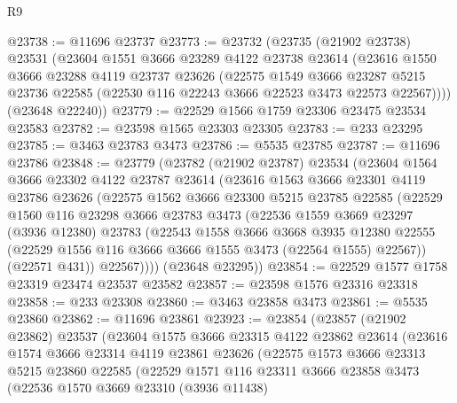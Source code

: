 \begin{lexlean}{R9}
\begin{coremodule}
@23738 := @11696 @23737
@23773 := @23732
    (@23735
      (@21902 @23738)
      @23531
      (@23604
        @1551
        @3666
        @23289
        @4122
        @23738
        @23614
        (@23616
          @1550
          @3666
          @23288
          @4119
          @23737
          @23626
          (@22575
            @1549
            @3666
            @23287
            @5215
            @23736
            @22585
            (@22530 @116 @22243 @3666 @22523 @3473 @22573 @22567))))
      (@23648 @22240))
@23779 := @22529 @1566 @1759 @23306 @23475 @23534 @23583
@23782 := @23598 @1565 @23303 @23305
@23783 := @233 @23295
@23785 := @3463 @23783 @3473
@23786 := @5535 @23785
@23787 := @11696 @23786
@23848 := @23779
    (@23782
      (@21902 @23787)
      @23534
      (@23604
        @1564
        @3666
        @23302
        @4122
        @23787
        @23614
        (@23616
          @1563
          @3666
          @23301
          @4119
          @23786
          @23626
          (@22575
            @1562
            @3666
            @23300
            @5215
            @23785
            @22585
            (@22529
              @1560
              @116
              @23298
              @3666
              @23783
              @3473
              (@22536
                @1559
                @3669
                @23297
                (@3936 @12380)
                @23783
                (@22543
                  @1558
                  @3666
                  @3668
                  @3935
                  @12380
                  @22555
                  (@22529 @1556 @116 @3666 @3666 @1555 @3473 (@22564 @1555) @22567))
                (@22571 @431))
              @22567))))
      (@23648 @23295))
@23854 := @22529 @1577 @1758 @23319 @23474 @23537 @23582
@23857 := @23598 @1576 @23316 @23318
@23858 := @233 @23308
@23860 := @3463 @23858 @3473
@23861 := @5535 @23860
@23862 := @11696 @23861
@23923 := @23854
    (@23857
      (@21902 @23862)
      @23537
      (@23604
        @1575
        @3666
        @23315
        @4122
        @23862
        @23614
        (@23616
          @1574
          @3666
          @23314
          @4119
          @23861
          @23626
          (@22575
            @1573
            @3666
            @23313
            @5215
            @23860
            @22585
            (@22529
              @1571
              @116
              @23311
              @3666
              @23858
              @3473
              (@22536
                @1570
                @3669
                @23310
                (@3936 @11438)

\end{coremodule}
\end{lexlean}
